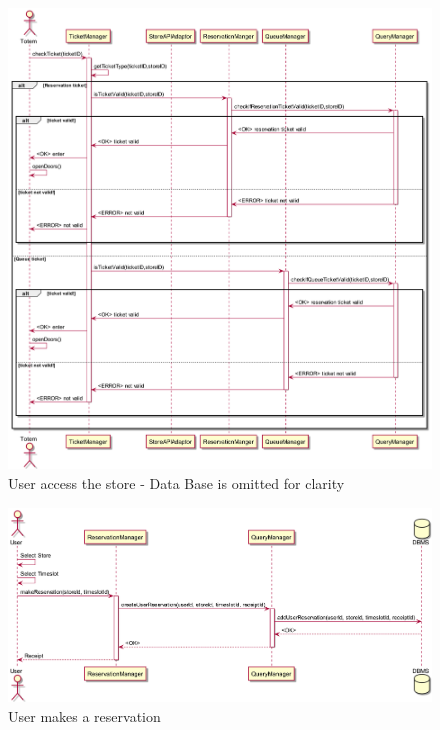\begin{figure}[H]
    \includegraphics[width=\linewidth]{uml/seq_user_enters_store.png}
    \caption{User access the store - Data Base is omitted for clarity}
    \label{fig:seq_user_access_store}
\end{figure}

\begin{figure}[H]
    \includegraphics[width=\linewidth]{uml/seq_make_reservation.png}
    \caption{User makes a reservation}
    \label{fig:seq_make_reservation}
\end{figure}
 
